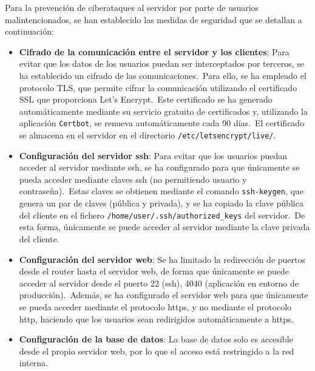 
Para la prevención de ciberataques al servidor por parte de usuarios malintencionados, se han
establecido las medidas de seguridad que se detallan a continuación:

\begin{itemize}
	\item \textbf{Cifrado de la comunicación entre el servidor y los clientes}: Para evitar que los datos de los
	usuarios puedan ser interceptados por terceros, se ha establecido un cifrado de las comunicaciones.\ Para ello, se
	ha empleado el protocolo TLS, que permite cifrar la comunicación utilizando el certificado SSL que proporciona
	Let's Encrypt.\ Este certificado se ha generado automáticamente mediante su servicio gratuito de certificados y,
	utilizando la aplicación \texttt{Certbot}, se renueva automáticamente cada 90 días.\ El certificado se
	almacena en el servidor en el directorio \texttt{/etc/letsencrypt/live/}.

	\item \textbf{Configuración del servidor ssh}: Para evitar que los usuarios puedan acceder al servidor mediante
	ssh, se ha configurado para que únicamente se pueda acceder mediante claves ssh (no permitiendo usuario y
	contraseña).\ Estas claves se obtienen mediante el comando \texttt{ssh-keygen}, que genera un par de claves
	(pública y privada), y se ha copiado la clave pública del cliente en el fichero
	\texttt{/home/user/.ssh/authorized\_keys} del servidor.\ De esta forma, únicamente se puede acceder al servidor
	mediante la
	clave privada del cliente.

	\item \textbf{Configuración del servidor web}: Se ha limitado la redirección de puertos desde el router hasta el
	servidor web, de forma que únicamente se puede acceder al servidor desde el puerto 22 (ssh), 4040 (aplicación
	en entorno de producción).\ Además, se ha configurado el servidor web
	para que únicamente se pueda acceder mediante el protocolo https, y no mediante el protocolo http, haciendo que
	los usuarios sean redirigidos automáticamente a https.

	\item \textbf{Configuración de la base de datos}: La base de datos solo es accesible desde el propio servidor web,
	por lo que el acceso está restringido a la red interna.
\end{itemize}

